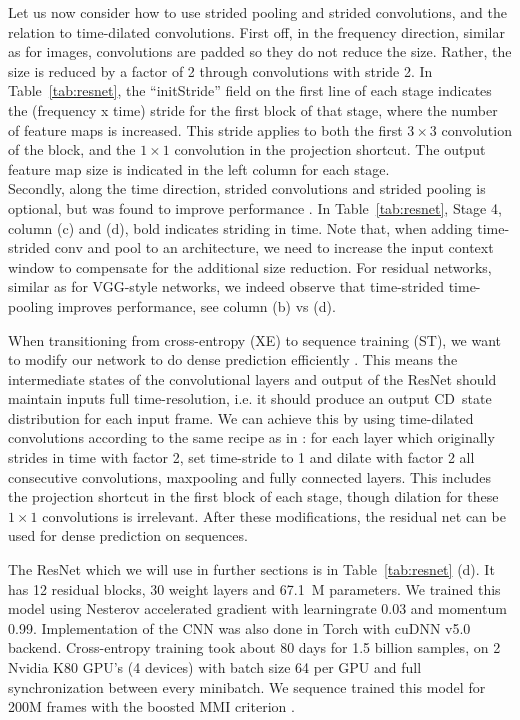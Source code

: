 \documentclass[a4paper]{article}
\begin{document}
Let us now consider how to use strided pooling and strided convolutions, and the relation to time-dilated convolutions.
First off, in the frequency direction, similar as for images, convolutions are padded so they do not reduce the size.
Rather, the size is reduced by a factor of 2 through convolutions with stride 2.
In Table~\ref{tab:resnet}, the ``initStride'' field on the first line of each stage indicates the (frequency x time) stride for the first block of that stage, where the number of feature maps is increased.
This stride applies to both the first $3 \times 3$ convolution of the block, and the $1 \times 1$ convolution in the projection shortcut.
The output feature map size is indicated in the left column for each stage.
\\
Secondly, along the time direction, strided convolutions and strided pooling is optional, but was found to improve performance \cite{sercu2016dense}.
In Table~\ref{tab:resnet}, Stage 4, column (c) and (d), bold indicates striding in time.
Note that, when adding time-strided conv and pool to an architecture, we need to increase the input context window to compensate for the additional size reduction.
For residual networks, similar as for VGG-style networks, we indeed observe that time-strided time-pooling improves performance, see column (b) vs (d).

When transitioning from cross-entropy (XE) to sequence training (ST), we want to modify our network to do dense prediction efficiently \cite{sercu2016dense}.
This means the intermediate states of the convolutional layers and output of the ResNet should maintain inputs full time-resolution, i.e. it should produce an output CD~state distribution for each input frame.
We can achieve this by using time-dilated convolutions according to the same recipe as in \cite{sercu2016dense}:
for each layer which originally strides in time with factor 2, set time-stride to 1 and dilate with factor 2 all consecutive convolutions, maxpooling and fully connected layers.
This includes the projection shortcut in the first block of each stage, though dilation for these $1 \times 1$ convolutions is irrelevant.
After these modifications, the residual net can be used for dense prediction on sequences.

The ResNet which we will use in further sections is in Table~\ref{tab:resnet} (d).
It has 12 residual blocks, 30 weight layers and 67.1~M parameters.
We trained this model using Nesterov accelerated gradient with learningrate 0.03 and momentum 0.99.
Implementation of the CNN was also done in Torch with cuDNN v5.0 backend.
Cross-entropy training took about 80 days for 1.5 billion samples, on 2 Nvidia K80 GPU's (4 devices) with batch size 64 per GPU and full synchronization between every minibatch.
We sequence trained this model for 200M frames with the boosted MMI criterion \cite{povey08}.
\end{document}
